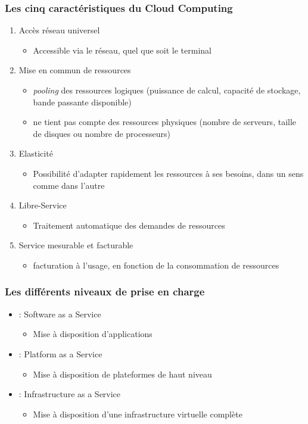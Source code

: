 \begin{frame}
\frametitle{Les cinq caractéristiques du Cloud Computing \cite{intro-cloud}}
\begin{enumerate}
\item <1>Accès réseau universel
\begin{itemize}
\item Accessible via le réseau, quel que soit le terminal
\end{itemize}
\item <2>Mise en commun de ressources
\begin{itemize}
\item \textit{pooling} des ressources logiques (puissance de calcul, capacité de stockage, bande passante disponible)
\item ne tient pas compte des ressources physiques (nombre de serveurs, taille de disques ou nombre de processeurs)
\end{itemize}
\item <3>Elasticité
\begin{itemize}
\item Possibilité d'adapter rapidement les ressources à ses besoins, dans un sens comme dans l'autre
\end{itemize}
\item <4>Libre-Service
\begin{itemize}
\item Traitement automatique des demandes de ressources
\end{itemize}
\item <5>Service mesurable et facturable
\begin{itemize}
\item facturation à l'usage, en fonction de la consommation de ressources
\end{itemize}
\end{enumerate}
\end{frame}

\begin{frame}
  \frametitle{Les différents niveaux de prise en charge}
  \begin{itemize}
  \item <1>[SaaS] : Software as a Service
  \begin{itemize}
  \item Mise à disposition d'applications
  \end{itemize}
  \item <2>[PaaS] : Platform as a Service
  \begin{itemize}
  \item Mise à disposition de plateformes de haut niveau
  \end{itemize}
  \item <3>[IaaS] : Infrastructure as a Service
  \begin{itemize}
  \item Mise à disposition d'une infrastructure virtuelle complète
  \end{itemize}
  \end{itemize}
\end{frame}

